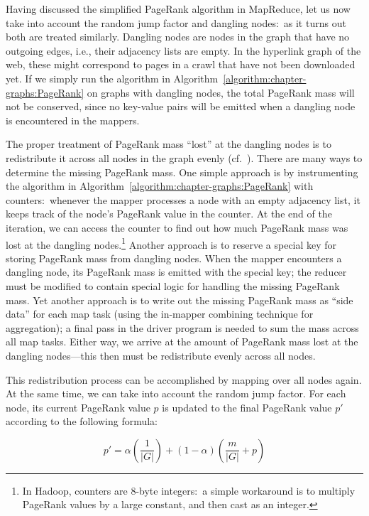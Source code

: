 Having discussed the simplified PageRank algorithm in MapReduce, let
us now take into account the random jump factor and dangling
nodes:\ as it turns out both are treated similarly.  Dangling nodes
are nodes in the graph that have no outgoing edges, i.e., their
adjacency lists are empty.  In the hyperlink graph of the web, these
might correspond to pages in a crawl that have not been downloaded
yet.  If we simply run the algorithm in
Algorithm~\ref{algorithm:chapter-graphs:PageRank} on graphs with dangling nodes,
the total PageRank mass will not be conserved, since no key-value
pairs will be emitted when a dangling node is encountered in the
mappers.

The proper treatment of PageRank mass ``lost'' at the dangling nodes
is to redistribute it across all nodes in the graph evenly
(cf.~\cite{Bianchini_etal_2005}).  There are many ways to determine
the missing PageRank mass.  One simple approach is by instrumenting
the algorithm in Algorithm~\ref{algorithm:chapter-graphs:PageRank} with
counters:\ whenever the mapper processes a node with an empty
adjacency list, it keeps track of the node's PageRank value in the
counter.  At the end of the iteration, we can access the counter to
find out how much PageRank mass was lost at the dangling
nodes.\footnote{In Hadoop, counters are 8-byte integers:\ a simple
  workaround is to multiply PageRank values by a large constant, and
  then cast as an integer.}  Another approach is to reserve a special
key for storing PageRank mass from dangling nodes.  When the mapper
encounters a dangling node, its PageRank mass is emitted with the
special key; the reducer must be modified to contain special logic for
handling the missing PageRank mass.  Yet another approach is to write
out the missing PageRank mass as ``side data'' for each map task
(using the in-mapper combining technique for aggregation); a final
pass in the driver program is needed to sum the mass across all map
tasks.  Either way, we arrive at the amount of PageRank mass lost at
the dangling nodes---this then must be redistribute evenly across all
nodes.

This redistribution process can be accomplished by mapping over all
nodes again.  At the same time, we can take into account the random
jump factor.  For each node, its current PageRank value $p$ is updated
to the final PageRank value $p'$ according to the following formula:

\begin{equation}
p' = \alpha \left( \frac{1}{|G|} \right) + \left( 1-\alpha \right) \left( \frac{m}{|G|} + p \right)
\end{equation}

